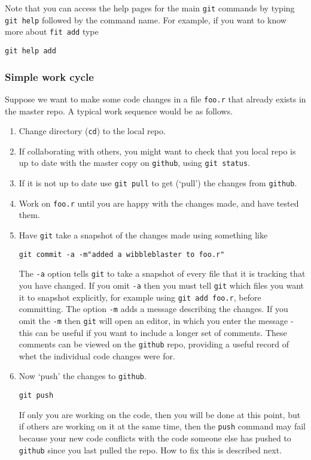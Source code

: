 \documentclass[10pt] {article}
\theoremstyle{definition}
\begin{document}
Note that you can access the help pages for the main {\tt git} commands by typing {\tt git help} followed by the command name. For example, if you want to know more about {\tt fit add} type
\begin{verbatim}
git help add
\end{verbatim}

\subsubsection{Simple work cycle}

Suppose we want to make some code changes in a file \verb+foo.r+ that already exists in the master repo. A typical work sequence would be as follows.
\begin{enumerate}
\item  Change directory ({\tt cd}) to the local repo. 
\item If collaborating with others, you might want to check that you local repo is up to date with the master copy on {\tt github}, using \verb+git status+.
\item If it is not up to date use \verb+git pull+ to get (`pull') the changes from {\tt github}. 
\item Work on {\tt foo.r} until you are happy with the changes made, and have tested them. 
\item Have {\tt git} take a snapshot of the changes made using something like 
\begin{verbatim}
git commit -a -m"added a wibbleblaster to foo.r"
\end{verbatim}  
The \verb+-a+ option tells {\tt git} to take a snapshot of every file that it is tracking that you have changed. If you omit \verb+-a+ then you must tell {\tt git} which files you want it to snapshot explicitly, for example using \verb+git add foo.r+, before committing. The option \verb+-m+ adds a message describing the changes. If you omit the \verb"-m" then {\tt git} will open an editor, in which you enter the message - this can be useful if you want to include a longer set of comments. These comments can be viewed on the {\tt github} repo, providing a useful record of whet the individual code changes were for.  
\item Now `push' the changes to {\tt github}. 
\begin{verbatim}
git push
\end{verbatim}
If only you are working on the code, then you will be done at this point, but if others are working on it at the same time, then the {\tt push} command may fail because your new code conflicts with the code someone else has pushed to {\tt github} since you last pulled the repo. How to fix this is described next. 
\end{enumerate} 
\end{document}
